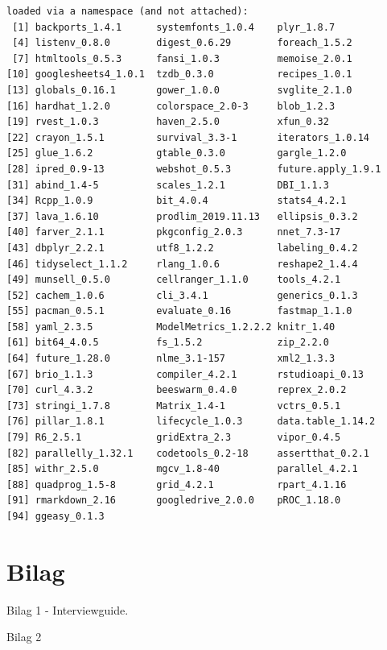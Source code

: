 \documentclass[
  12pt,
  a4paper,
  DIV=11,
  numbers=noendperiod]{scrartcl}
\begin{document}
\begin{verbatim}
loaded via a namespace (and not attached):
 [1] backports_1.4.1      systemfonts_1.0.4    plyr_1.8.7          
 [4] listenv_0.8.0        digest_0.6.29        foreach_1.5.2       
 [7] htmltools_0.5.3      fansi_1.0.3          memoise_2.0.1       
[10] googlesheets4_1.0.1  tzdb_0.3.0           recipes_1.0.1       
[13] globals_0.16.1       gower_1.0.0          svglite_2.1.0       
[16] hardhat_1.2.0        colorspace_2.0-3     blob_1.2.3          
[19] rvest_1.0.3          haven_2.5.0          xfun_0.32           
[22] crayon_1.5.1         survival_3.3-1       iterators_1.0.14    
[25] glue_1.6.2           gtable_0.3.0         gargle_1.2.0        
[28] ipred_0.9-13         webshot_0.5.3        future.apply_1.9.1  
[31] abind_1.4-5          scales_1.2.1         DBI_1.1.3           
[34] Rcpp_1.0.9           bit_4.0.4            stats4_4.2.1        
[37] lava_1.6.10          prodlim_2019.11.13   ellipsis_0.3.2      
[40] farver_2.1.1         pkgconfig_2.0.3      nnet_7.3-17         
[43] dbplyr_2.2.1         utf8_1.2.2           labeling_0.4.2      
[46] tidyselect_1.1.2     rlang_1.0.6          reshape2_1.4.4      
[49] munsell_0.5.0        cellranger_1.1.0     tools_4.2.1         
[52] cachem_1.0.6         cli_3.4.1            generics_0.1.3      
[55] pacman_0.5.1         evaluate_0.16        fastmap_1.1.0       
[58] yaml_2.3.5           ModelMetrics_1.2.2.2 knitr_1.40          
[61] bit64_4.0.5          fs_1.5.2             zip_2.2.0           
[64] future_1.28.0        nlme_3.1-157         xml2_1.3.3          
[67] brio_1.1.3           compiler_4.2.1       rstudioapi_0.13     
[70] curl_4.3.2           beeswarm_0.4.0       reprex_2.0.2        
[73] stringi_1.7.8        Matrix_1.4-1         vctrs_0.5.1         
[76] pillar_1.8.1         lifecycle_1.0.3      data.table_1.14.2   
[79] R6_2.5.1             gridExtra_2.3        vipor_0.4.5         
[82] parallelly_1.32.1    codetools_0.2-18     assertthat_0.2.1    
[85] withr_2.5.0          mgcv_1.8-40          parallel_4.2.1      
[88] quadprog_1.5-8       grid_4.2.1           rpart_4.1.16        
[91] rmarkdown_2.16       googledrive_2.0.0    pROC_1.18.0         
[94] ggeasy_0.1.3        
\end{verbatim}

\hypertarget{bilag}{%
\section{Bilag}\label{bilag}}

Bilag 1 - Interviewguide.

Bilag 2~
\end{document}
